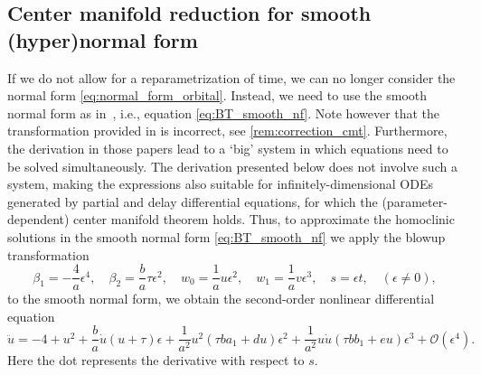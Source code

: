 \subsection{Center manifold reduction for smooth (hyper)normal form} 
\label{sec:center-manifold-reduction-without-time-reparametrization}
If we do not allow for a reparametrization of time, we can no longer consider the
normal form \cref{eq:normal_form_orbital}. Instead, we need to use the smooth
normal form as in~\cite{Gray-Scott2015,Al-Hdaibat2016}, i.e., equation
\cref{eq:BT_smooth_nf}. Note however that the transformation provided in
\cite{Gray-Scott2015,Al-Hdaibat2016} is incorrect, see \cref{rem:correction_cmt}.
Furthermore, the derivation in those papers lead to a `big' system in which
equations need to be solved simultaneously. The derivation presented below does
not involve such a system, making the expressions also suitable for
infinitely-dimensional ODEs generated by partial and delay differential
equations, for which the (parameter-dependent) center manifold theorem holds.
Thus, to approximate the homoclinic solutions in the smooth normal form
\cref{eq:BT_smooth_nf} we apply the blowup transformation
\begin{equation}
\label{eq:blowup_smooth}				
\beta_1 = - \frac4a \epsilon^4, \quad 
\beta_2 = \frac b a \tau \epsilon^2, \quad 
w_0 = \frac1a u \epsilon^2, \quad
w_1 = \frac1a v \epsilon^3, \quad
s = \epsilon t, \quad (\epsilon \neq 0),
\end{equation}
to the smooth normal form, we obtain the second-order nonlinear differential
equation 
\begin{equation}
\label{eq:second_order_nonlinear_oscillator_smooth_normalform}
				\ddot u = -4 + u^2 + \frac ba \dot u \left( u + \tau \right)\epsilon 
				+ \frac1{a^2} u^2\left(\tau b a_1 + d u \right) \epsilon^2
        + \frac1{a^2} u\dot u \left( \tau b b_1 + e u \right) \epsilon^3
				+ \mathcal{O}(\epsilon^4).
\end{equation}
Here the dot represents the derivative with respect to $s$. 

